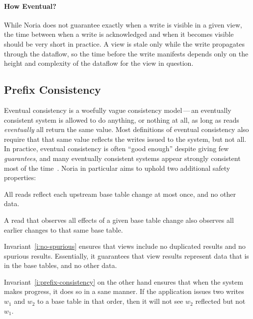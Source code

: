 \paragraph{How Eventual?}
While Noria does not guarantee exactly when a write is visible in a given view,
the time between when a write is acknowledged and when it becomes visible should
be very short in practice. A view is stale only while the write propagates
through the dataflow, so the time before the write manifests depends only on the
height and complexity of the dataflow for the view in question.

\subsection{Prefix Consistency}

Eventual consistency is a woefully vague consistency model\,---\,an eventually
consistent system is allowed to do anything, or nothing at all, as long as reads
\emph{eventually} all return the same value. Most definitions of eventual
consistency also require that that same value reflects the writes issued to the
system, but not all. In practice, eventual consistency is often ``good enough''
despite giving few \emph{guarantees}, and many eventually consistent systems
appear strongly consistent most of the time~\cite{eventual}. Noria in particular
aims to uphold two additional safety properties:

\begin{invariant}
  \label{i:no-spurious}
  All reads reflect each upstream base table change at most once, and no other
  data.
\end{invariant}

\begin{invariant}
  \label{i:prefix-consistency}
  A read that observes all effects of a given base table change also observes
  all earlier changes to that same base table.
\end{invariant}

Invariant~\ref{i:no-spurious} ensures that views include no duplicated results
and no spurious results. Essentially, it guarantees that view results represent
data that is in the base tables, and no other data.

Invariant~\ref{i:prefix-consistency} on the other hand ensures that when the
system makes progress, it does so in a sane manner. If the application issues
two writes $w_1$ and $w_2$ to a base table in that order, then it will not see
$w_2$ reflected but not $w_1$.

